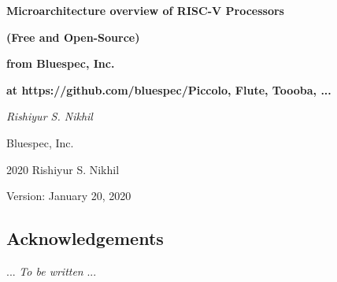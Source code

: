 \documentclass[11pt]{book}
\begin{document}

\pagestyle{empty}

\begin{center}

\vspace*{1in}

{\LARGE\bf Microarchitecture overview of RISC-V Processors}

\vspace{1ex}

{\LARGE\bf (Free and  Open-Source)}

\vspace{1ex}

{\LARGE\bf from Bluespec, Inc.}

\vspace{1ex}

{\Large\bf at https://github.com/bluespec/Piccolo, Flute, Toooba, ...}

\vspace{0.5in}

{\Large \emph{Rishiyur S. Nikhil}}

{\Large Bluespec, Inc.} \\

\vspace*{3in}

\textcopyright{} 2020 Rishiyur S. Nikhil

\vspace{0.5in}

Version: January 20, 2020

\end{center}


\newpage

\setcounter{page}{2}

\vspace*{2in}

\noindent
\subsection*{Acknowledgements}

... \emph{To be written} ...


\pagestyle{myheadings}
\end{document}
